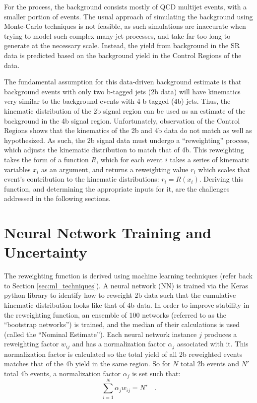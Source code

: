     For the \vbfproc process, the background consists mostly of QCD multijet events,
        with a smaller portion of \ttbar events.
    The usual approach of simulating the background using Monte-Carlo techniques is not feasible,
        as such simulations are inaccurate when trying to model such complex many-jet processes,
        and take far too long to generate at the necessary scale.
    Instead, the yield from background in the SR data is predicted based on the background yield in the Control Regions of the data.
        
    The fundamental assumption for this data-driven background estimate
        is that background events with only two b-tagged jets (2b data)
        will have kinematics very similar to the background events with 4 b-tagged (4b) jets.
    Thus, the kinematic distribution of the 2b signal region can be used as an estimate of the background in the 4b signal region.
    Unfortunately, observation of the Control Regions shows that the kinematics of the 2b and 4b data do not match as well as hypothesized.
    As such, the 2b signal data must undergo a ``reweighting'' process,
        which adjusts the kinematic distribution to match that of 4b.
    This reweighting takes the form of a function $R$,
        which for each event $i$ takes a series of kinematic variables $x_i$ as an argument,
        and returns a reweighting value $r_i$ which scales that event's contribution to the kinematic distributions:
        $r_i = R(x_i)$.
    Deriving this function, and determining the appropriate inputs for it,
        are the challenges addressed in the following sections.

\FloatBarrier
\section{Neural Network Training and Uncertainty} \label{sec:nn_training}

    The reweighting function is derived using machine learning techniques (refer back to Section \ref{sec:ml_techniques}).
    A neural network (NN) is trained via the Keras python library to identify how to reweight 2b data
        such that the cumulative kinematic distribution looks like that of 4b data.
    In order to improve stability in the reweighting function,
        an ensemble of 100 networks (referred to as the ``bootstrap networks'') is trained,
        and the median of their calculations is used (called the ``Nominal Estimate'').
    Each neural network instance $j$ produces a reweighting factor $w_{ij}$ and has a normalization factor $\alpha_j$ associated with it.
    This normalization factor is calculated so the total yield of all 2b reweighted events matches that of the 4b yield in the same region. 
    So for $N$ total 2b events and $N'$ total 4b events, a normalization factor $\alpha_j$ is set such that:
        \begin{equation}
            \sum_{i=1}^{N} \alpha_j w_{ij} = N'
            \quad.
        \end{equation}

